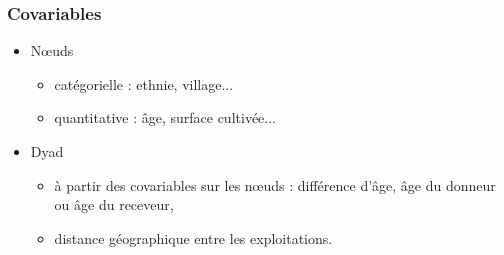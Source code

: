 \documentclass[nopagenumber,9pt]{beamer}
\begin{document}
\begin{frame}
 \frametitle{Covariables}
 
 
 \begin{itemize}
  \item N\oe uds
  
  \begin{itemize}
   \item catégorielle : ethnie, village...
   \item quantitative : \^age, surface cultivée...
  \end{itemize}

  \bigskip
  
  \item Dyad
  
  \begin{itemize}
   \item à partir des covariables sur les n\oe uds : différence d'\^age, \^age du donneur ou \^age du receveur,
   \item distance géographique entre les exploitations.
  \end{itemize}

  
  
 \end{itemize}

 
\end{frame}
\end{document}

